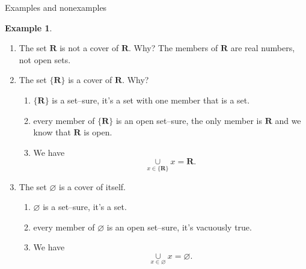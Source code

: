 \documentclass[fleqn]{beamer}
\newcommand{\reals}{\mathbf{R}}
\theoremstyle{definition}
\newtheorem{myex}{Example}
\begin{document}
\begin{frame}{Examples and nonexamples}

  \begin{myex}
    \begin{enumerate}
     \item The set \(\reals\) is not a cover of \(\reals\). Why? The members of \(\reals\) are real numbers, not open sets.

     \item The set \(\{\reals \}\) is a cover of \(\reals\).  Why? 

   \begin{enumerate}
    \item   \(\{\reals \}\) is a set--sure, it's a set with one member that is a set.

   \item every member of \(\{\reals \}\) is an open set--sure, the only member is \(\reals\) and we know that \(\reals\) is open.

    \item We have
     \[
      \underset{x \in \{\reals \} }{\cup} x = \reals.
     \]

\end{enumerate}

  \item The set \(\varnothing\) is a cover of itself.

\begin{enumerate}
    \item   \(\varnothing \) is a set--sure, it's a set.

   \item every member of \(\varnothing \) is an open set--sure,  it's vacuously true.

    \item We have
     \[
      \underset{x \in  \varnothing }{\cup} x = \varnothing.
     \]
\end{enumerate}
\end{enumerate}
  \end{myex}
\end{frame}
\end{document}
